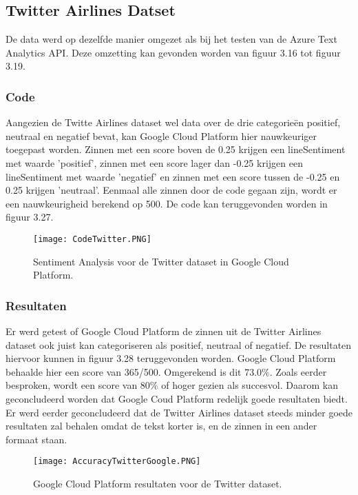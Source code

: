 \subsection{Twitter Airlines Datset}
\label{twittergoogleplatform}

De data werd op dezelfde manier omgezet als bij het testen van de Azure Text Analytics API. Deze omzetting kan gevonden worden van figuur 3.16 tot figuur 3.19.

\subsubsection{Code}
\label{twittercodegoogleplatform}
Aangezien de Twitte Airlines dataset wel data over de drie categorieën positief, neutraal en negatief bevat, kan Google Cloud Platform hier nauwkeuriger toegepast worden. Zinnen met een score boven de 0.25 krijgen een lineSentiment met waarde 'positief', zinnen met een score lager dan -0.25 krijgen een lineSentiment met waarde 'negatief' en zinnen met een score tussen de -0.25 en 0.25 krijgen 'neutraal'. Eenmaal alle zinnen door de code gegaan zijn, wordt er een nauwkeurigheid berekend op 500. De code kan teruggevonden worden in figuur 3.27.

\begin{figure}[!htbp]
    \texttt{[image: CodeTwitter.PNG]}
    \caption{\label{codetwitter}Sentiment Analysis voor de Twitter dataset in Google Cloud Platform.}
\end{figure}
\FloatBarrier 

\subsubsection{Resultaten}
\label{twitterresultatengoogleplatform}
Er werd getest of Google Cloud Platform de zinnen uit de Twitter Airlines dataset ook juist kan categoriseren als positief, neutraal of negatief. De resultaten hiervoor kunnen in figuur 3.28 teruggevonden worden. Google Cloud Platform behaalde hier een score van 365/500. Omgerekend is dit 73.0\%. Zoals eerder besproken, wordt een score van 80\% of hoger gezien als succesvol. Daarom kan geconcludeerd worden dat Google Coud Platform redelijk goede resultaten biedt. Er werd eerder geconcludeerd dat de Twitter Airlines dataset steeds minder goede resultaten zal behalen omdat de tekst korter is, en de zinnen in een ander formaat staan. 

\begin{figure}[!htbp]
    \texttt{[image: AccuracyTwitterGoogle.PNG]}
    \caption{\label{accuracytwitter}Google Cloud Platform resultaten voor de Twitter dataset.}
\end{figure}
\FloatBarrier 

